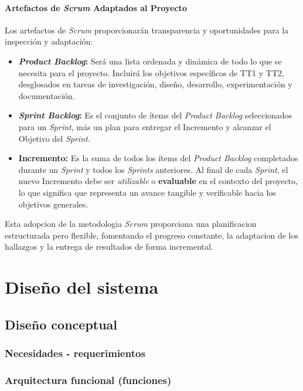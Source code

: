 \documentclass[12pt]{article}
\begin{document}
\paragraph{Artefactos de \textit{Scrum} Adaptados al Proyecto}
\label{sssec:artefactos_scrum_proyecto}
Los artefactos de \textit{Scrum} proporcionarán transparencia y oportunidades para la inspección y adaptación:
\begin{itemize}
    \item \textbf{\textit{Product Backlog}:} Será una lista ordenada y dinámica de todo lo que se necesita para el proyecto. Incluirá los objetivos específicos de TT1 y TT2, desglosados en tareas de investigación, diseño, desarrollo, experimentación y documentación.
    \item \textbf{\textit{Sprint Backlog}:} Es el conjunto de ítems del \textit{Product Backlog} seleccionados para un \textit{Sprint}, más un plan para entregar el Incremento y alcanzar el Objetivo del \textit{Sprint}.
    \item \textbf{Incremento:} Es la suma de todos los ítems del \textit{Product Backlog} completados durante un \textit{Sprint} y todos los \textit{Sprints} anteriores. Al final de cada \textit{Sprint}, el nuevo Incremento debe ser \textit{utilizable} o \textbf{evaluable} en el contexto del proyecto, lo que significa que representa un avance tangible y verificable hacia los objetivos generales.
\end{itemize}
Esta adopcion de la metodologia \textit{Scrum} proporciona una planificacion estructurada pero flexible, fomentando el progreso constante, la adaptacion de los hallazgos y la entrega de resultados de forma incremental.

\section{Diseño del sistema}

\subsection{Diseño conceptual}
\subsubsection{Necesidades - requerimientos}
\subsubsection{Arquitectura funcional (funciones)}
\end{document}
